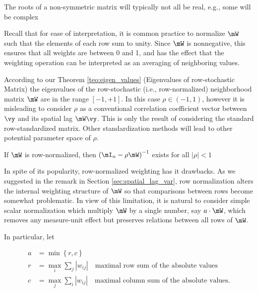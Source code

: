 \documentclass[english,12pt]{book}\usepackage[]{graphicx}\usepackage[]{xcolor}
\begin{document}
\begin{remark}
The roots of a non-symmetric matrix will typically not all be real, e.g., some will be complex
\end{remark}

Recall that for ease of interpretation, it is common practice to normalize $\mW$ such that the elements of each row sum to unity. Since $\mW$ is nonnegative, this ensures that all weights are between 0 and 1, and has the effect that the weighting operation can be interpreted as an averaging of neighboring values. 

According to our Theorem \ref{teo:eigen_values} (Eigenvalues of row-stochastic Matrix) the eigenvalues of the row-stochastic (i.e., row-normalized) neighborhood matrix $\mW$ are in the range $\left[-1, +1\right]$. In this case $\rho \in (-1, 1)$, however it is misleading to consider $\rho$ as a conventional correlation coefficient vector between $\vy$ and its spatial lag $\mW\vy$. This is only the result of considering the standard row-standardized matrix. Other standardization methods will lead to other potential parameter space of $\rho$. 


\begin{theorem}
If $\mW$ is row-normalized, then  $\left(\mI_n - \rho\mW\right)^{-1}$ exists for all $\left|\rho \right| < 1$
\end{theorem}

In spite of its popularity, row-normalized weighting has it drawbacks. As we suggested in the remark in Section \ref{sec:spatial_lag_var}, row normalization alters the internal weighting structure of $\mW$ so that comparisons between rows become somewhat problematic. In view of this limitation, it is natural to consider simple scalar normalization which multiply $\mW$ by a single number, say $a \cdot \mW$, which removes any measure-unit effect but preserves relations between all rows of $\mW$. 

In particular, let

\begin{equation*}
  \begin{aligned}
    a & = \min \left\lbrace r, c \right\rbrace \\
    r & = \max_i \sum_j \left|w_{ij}\right|\quad \mbox{maximal row sum of the absolute values} \\
    c & = \max_j \sum_i \left|w_{ij}\right|\quad \mbox{maximal column sum of the absolute values}.
  \end{aligned}
\end{equation*}
\end{document}
